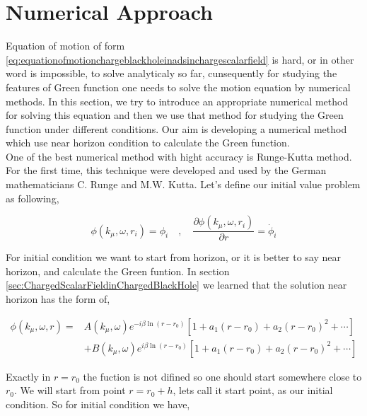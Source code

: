 \section{Numerical Approach}

Equation of motion of form \ref{eq:equationofmotionchargeblackholeinadsinchargescalarfield} is hard, or in other word is impossible, to solve analyticaly so far, cunsequently for studying the features of Green function one needs to solve the motion equation by numerical methods. In this section, we try to introduce an appropriate numerical method for solving this equation and then we use that method for studying the Green function under different conditions. Our aim is developing a numerical method which use near horizon condition to calculate the Green function.\\

One of the best numerical method with hight accuracy is Runge-Kutta method. For the first time, this technique were developed and used by the German mathematicians C. Runge and M.W. Kutta. Let's define our initial value problem as following,

\begin{equation}
    \phi(k_\mu,\omega,r_i) = \phi_i \quad , \quad \frac{\partial \phi(k_\mu,\omega,r_i)}{\partial r} = \dot{\phi}_i
\end{equation}

For initial condition we want to start from horizon, or it is better to say near horizon, and calculate the Green funtion. In section \ref{sec:ChargedScalarFieldinChargedBlackHole} we learned that the solution near horizon has the form of,

\begin{align}
    \phi(k_\mu,\omega,r) =& A(k_\mu,\omega)e^{-i\beta\ln{(r-r_0)}}\left[1+a_1(r-r_0)+ a_2(r-r_0)^2 + \cdots \right] \nonumber\\
             & + B(k_\mu,\omega)e^{i\beta\ln{(r-r_0)}}\left[1+a_1(r-r_0)+ a_2(r-r_0)^2 + \cdots \right]
\end{align}

Exactly in $r=r_0$ the fuction is not difined so one should start somewhere close to $r_0$. We will start from point $r = r_0 + h$, lets call it start point, as our initial condition. So for initial condition we have, 

